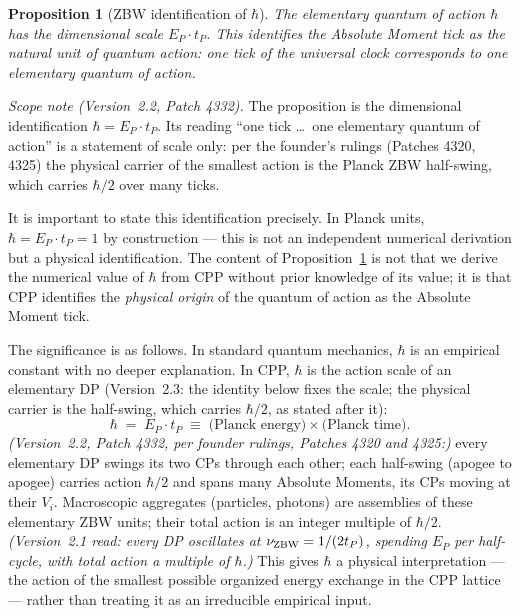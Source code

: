 \documentclass[12pt]{article}
\newtheorem{proposition}[theorem]{Proposition}
\newcommand{\EP}{E_P}
\newcommand{\tP}{t_P}
\begin{document}
\begin{proposition}[ZBW identification of $\hbar$]
\label{prop:hbar}
The elementary quantum of action $\hbar$ has the dimensional scale
$\EP\cdot\tP$.  This identifies the Absolute Moment tick as the natural unit
of quantum action: one tick of the universal clock corresponds to one
elementary quantum of action.
\end{proposition}

\noindent\emph{Scope note (Version~2.2, Patch 4332).} The proposition is the dimensional
identification $\hbar = \EP\cdot\tP$. Its reading ``one tick \ldots\ one elementary quantum
of action'' is a statement of scale only: per the founder's rulings (Patches 4320, 4325) the
physical carrier of the smallest action is the Planck ZBW half-swing, which carries $\hbar/2$
over many ticks.

It is important to state this identification precisely.  In Planck units,
$\hbar = \EP\cdot\tP = 1$ by construction --- this is not an independent
numerical derivation but a physical identification.  The content of
Proposition~\ref{prop:hbar} is not that we derive the numerical value of
$\hbar$ from CPP without prior knowledge of its value; it is that CPP
identifies the \emph{physical origin} of the quantum of action as the
Absolute Moment tick.

The significance is as follows.  In standard quantum mechanics, $\hbar$ is an
empirical constant with no deeper explanation.  In CPP, $\hbar$ is the action
scale of an elementary DP (Version~2.3: the identity below fixes the scale; the physical
carrier is the half-swing, which carries $\hbar/2$, as stated after it):
\begin{equation}
  \hbar \;=\; \EP \cdot \tP
  \;\equiv\; \text{(Planck energy)} \times \text{(Planck time)}.
  \label{eq:hbar}
\end{equation}
\emph{(Version~2.2, Patch 4332, per founder rulings, Patches 4320 and 4325:)} every
elementary DP swings its two CPs through each other; each half-swing (apogee to
apogee) carries action $\hbar/2$ and spans many Absolute Moments, its CPs moving
at their $V_i$.  Macroscopic aggregates (particles, photons) are assemblies of
these elementary ZBW units; their total action is an integer multiple of
$\hbar/2$.  \emph{(Version~2.1 read: every DP oscillates at
$\nu_{\rm ZBW} = 1/(2\tP)$, spending $\EP$ per half-cycle, with total action a
multiple of $\hbar$.)}  This gives $\hbar$ a physical interpretation --- the action of the
smallest possible organized energy exchange in the CPP lattice --- rather than
treating it as an irreducible empirical input.
\end{document}
